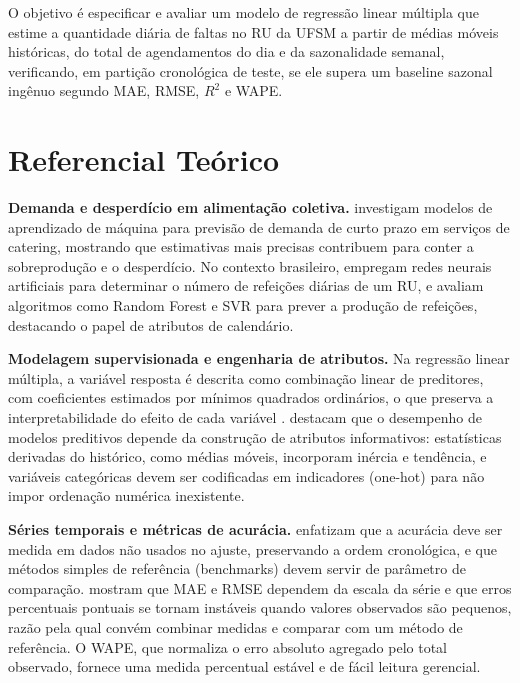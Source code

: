 \documentclass[11pt]{article}
\begin{document}
O objetivo é especificar e avaliar um modelo de regressão linear múltipla que estime a quantidade diária de faltas no RU da UFSM a partir de médias móveis históricas, do total de agendamentos do dia e da sazonalidade semanal, verificando, em partição cronológica de teste, se ele supera um baseline sazonal ingênuo segundo MAE, RMSE, $R^2$ e WAPE.

\section{Referencial Teórico}

\textbf{Demanda e desperdício em alimentação coletiva.} \citet{rodrigues2024machine} investigam modelos de aprendizado de máquina para previsão de demanda de curto prazo em serviços de catering, mostrando que estimativas mais precisas contribuem para conter a sobreprodução e o desperdício. No contexto brasileiro, \citet{rocha2011utilizaccao} empregam redes neurais artificiais para determinar o número de refeições diárias de um RU, e \citet{de2021metodo} avaliam algoritmos como Random Forest e SVR para prever a produção de refeições, destacando o papel de atributos de calendário.

\textbf{Modelagem supervisionada e engenharia de atributos.} Na regressão linear múltipla, a variável resposta é descrita como combinação linear de preditores, com coeficientes estimados por mínimos quadrados ordinários, o que preserva a interpretabilidade do efeito de cada variável \citep{gareth2023introduction}. \citet{kuhn2019feature} destacam que o desempenho de modelos preditivos depende da construção de atributos informativos: estatísticas derivadas do histórico, como médias móveis, incorporam inércia e tendência, e variáveis categóricas devem ser codificadas em indicadores (one-hot) para não impor ordenação numérica inexistente.

\textbf{Séries temporais e métricas de acurácia.} \citet{hyndman2012principles} enfatizam que a acurácia deve ser medida em dados não usados no ajuste, preservando a ordem cronológica, e que métodos simples de referência (benchmarks) devem servir de parâmetro de comparação. \citet{hyndman2006another} mostram que MAE e RMSE dependem da escala da série e que erros percentuais pontuais se tornam instáveis quando valores observados são pequenos, razão pela qual convém combinar medidas e comparar com um método de referência. O WAPE, que normaliza o erro absoluto agregado pelo total observado, fornece uma medida percentual estável e de fácil leitura gerencial.
\end{document}
